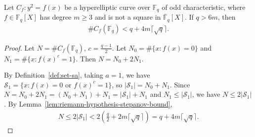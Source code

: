 \begin{lemma}\label{lem:riemann-hypothesis-upper-bound} \leanok {}
  Let $C_f : y^2 = f(x)$ be a hyperelliptic curve over $\mathbb{F}_q$ of odd characteristic, where $f \in \mathbb{F}_q[X]$ has degree $m \geq 3$ and is not a square in $\overline{\mathbb{F}}_q[X]$. If $q > 6m$, then
  \begin{align*}
    \#C_f(\mathbb{F}_q) < q + 4m\lceil\sqrt{q}\rceil.
  \end{align*}
\end{lemma}
\begin{proof} \leanok
  Let $N = \#C_f(\mathbb{F}_q)$, $c = \frac{q-1}{2}$. Let $N_0 = \#\{x : f(x) = 0\}$ and $N_1 = \#\{x : f(x)^c = 1\}$. Then $N = N_0 + 2N_1$.

  By Definition~\ref{def:set-sa}, taking $a = 1$, we have $\mathcal{S}_1 = \{x : f(x) = 0 \text{ or } f(x)^c = 1\}$, so $|\mathcal{S}_1| = N_0 + N_1$. Since $N = N_0 + 2N_1 = (N_0 + N_1) + N_1 = |\mathcal{S}_1| + N_1$ and $N_1 \leq |\mathcal{S}_1|$, we have $N \leq 2|\mathcal{S}_1|$. By Lemma~\ref{lem:riemann-hypothesis-stepanov-bound},
  \begin{align*}
    N \leq 2|\mathcal{S}_1| < 2\left(\frac{q}{2} + 2m\lceil\sqrt{q}\rceil\right) = q + 4m\lceil\sqrt{q}\rceil.
  \end{align*}
\end{proof}

